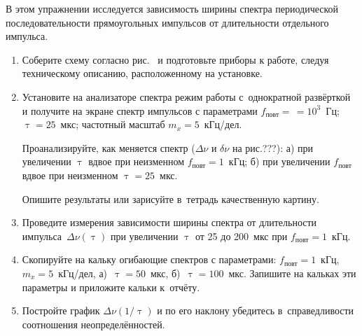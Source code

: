 \begin{lab:task}

В этом упражнении исследуется зависимость ширины спектра периодической последовательности прямоугольных импульсов от длительности отдельного импульса.

\begin{enumerate}
	\item Соберите схему согласно рис.~ и подготовьте приборы к работе, следуя техническому описанию, расположенному на установке.
	\item Установите на анализаторе спектра режим работы с~однократной развёрткой и получите на экране спектр импульсов с параметрами $f_\text{повт}=\,=10^3$~Гц; $\uptau=25$~мкс; частотный масштаб $m_x=5$~кГц/дел.

	Проанализируйте, как меняется спектр ($\Delta\nu$ и $\delta\nu$ на рис.???):
	а) при увеличении $\uptau$ вдвое при неизменном $f_\text{повт}=1$~кГц; 
	б) при увеличении $f_\text{повт}$ вдвое при неизменном $\uptau=25$~мкс.
	
	Опишите результаты или зарисуйте в~тетрадь качественную картину.
	\item Проведите измерения зависимости ширины спектра от длительности импульса~$\Delta \nu(\uptau)$ при увеличении $\uptau$ от 25 до 200~мкс при $f_\text{повт}=1$~кГц.
	\item Скопируйте на кальку  огибающие спектров с параметрами: $f_\text{повт}=1$~кГц, $m_x=5$~кГц/дел, а)~$\uptau=50$~мкс, б)~$\uptau=100$~мкс. Запишите на кальках эти параметры и приложите кальки к~отчёту.
	\item Постройте график $\Delta \nu(1/\uptau)$ и по его наклону убедитесь в~справедливости соотношения неопределённостей.
\end{enumerate}
\end{lab:task}



